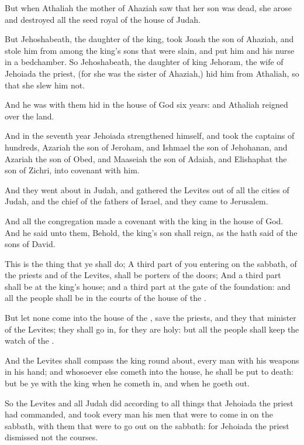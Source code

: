 \Verse But when Athaliah the mother of Ahaziah saw that her son was dead, she arose and destroyed all the seed royal of the house of Judah.

\Verse But Jehoshabeath, the daughter of the king, took Joash the son of Ahaziah, and stole him from among the king's sons that were slain, and put him and his nurse in a bedchamber. So Jehoshabeath, the daughter of king Jehoram, the wife of Jehoiada the priest, (for she was the sister of Ahaziah,) hid him from Athaliah, so that she slew him not.

\Verse And he was with them hid in the house of God six years: and Athaliah reigned over the land.


\Chapter
\Verse And in the seventh year Jehoiada strengthened himself, and took the captains of hundreds, Azariah the son of Jeroham, and Ishmael the son of Jehohanan, and Azariah the son of Obed, and Maaseiah the son of Adaiah, and Elishaphat the son of Zichri, into covenant with him.

\Verse And they went about in Judah, and gathered the Levites out of all the cities of Judah, and the chief of the fathers of Israel, and they came to Jerusalem.

\Verse And all the congregation made a covenant with the king in the house of God. And he said unto them, Behold, the king's son shall reign, as the \LORD hath said of the sons of David.

\Verse This is the thing that ye shall do; A third part of you entering on the sabbath, of the priests and of the Levites, shall be porters of the doors; \Verse And a third part shall be at the king's house; and a third part at the gate of the foundation: and all the people shall be in the courts of the house of the \LORD.

\Verse But let none come into the house of the \LORD, save the priests, and they that minister of the Levites; they shall go in, for they are holy: but all the people shall keep the watch of the \LORD.

\Verse And the Levites shall compass the king round about, every man with his weapons in his hand; and whosoever else cometh into the house, he shall be put to death: but be ye with the king when he cometh in, and when he goeth out.

\Verse So the Levites and all Judah did according to all things that Jehoiada the priest had commanded, and took every man his men that were to come in on the sabbath, with them that were to go out on the sabbath: for Jehoiada the priest dismissed not the courses.

